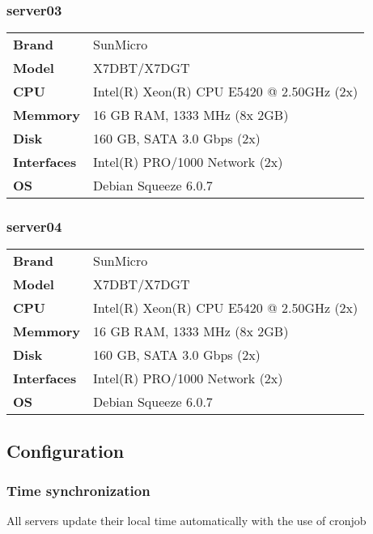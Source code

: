 \documentclass[Configuration]{subfiles}
\begin{document}
\subsubsection{server03}
\begin{table}[h]
\centering
\begin{tabular}{p{2cm} p{9cm} }
\textbf{Brand} & SunMicro \\
\textbf{Model} & X7DBT/X7DGT \\
\textbf{CPU} & Intel(R) Xeon(R) CPU E5420 @ 2.50GHz (2x)\\
\textbf{Memmory} & 16 GB RAM, 1333 MHz (8x 2GB) \\
\textbf{Disk} & 160 GB, SATA 3.0 Gbps (2x)\\
\textbf{Interfaces} &   Intel(R) PRO/1000 Network (2x) \\
\textbf{OS} & Debian Squeeze 6.0.7 \\
\end{tabular}
\end{table}

\subsubsection{server04}
\begin{table}[h]
\centering
\begin{tabular}{p{2cm} p{9cm} }
\textbf{Brand} & SunMicro \\
\textbf{Model} & X7DBT/X7DGT \\
\textbf{CPU} & Intel(R) Xeon(R) CPU E5420 @ 2.50GHz (2x)\\
\textbf{Memmory} & 16 GB RAM, 1333 MHz (8x 2GB) \\
\textbf{Disk} & 160 GB, SATA 3.0 Gbps (2x)\\
\textbf{Interfaces} &   Intel(R) PRO/1000 Network (2x) \\
\textbf{OS} & Debian Squeeze 6.0.7 \\
\end{tabular}
\end{table}

\subsection{Configuration}

\subsubsection{Time synchronization}
All servers update their local time automatically with the use of cronjob
\end{document}

